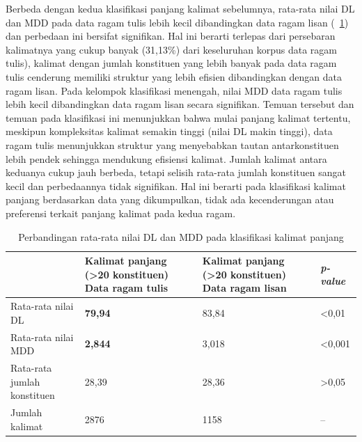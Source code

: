 Berbeda dengan kedua klasifikasi panjang kalimat sebelumnya, rata-rata nilai DL dan MDD pada data ragam tulis lebih kecil dibandingkan data ragam lisan (\tab~\ref{tab:DL_MDD_panjang}) dan perbedaan ini bersifat signifikan. Hal ini berarti terlepas dari persebaran kalimatnya yang cukup banyak (31,13\%) dari keseluruhan korpus data ragam tulis), kalimat dengan jumlah konstituen yang lebih banyak pada data ragam tulis cenderung memiliki struktur yang lebih efisien dibandingkan dengan data ragam lisan. Pada kelompok klasifikasi menengah, nilai MDD data ragam tulis lebih kecil dibandingkan data ragam lisan secara signifikan. Temuan tersebut dan temuan pada klasifikasi ini menunjukkan bahwa mulai panjang kalimat tertentu, meskipun kompleksitas kalimat semakin tinggi (nilai DL makin tinggi), data ragam tulis menunjukkan struktur yang menyebabkan tautan antarkonstituen lebih pendek sehingga mendukung efisiensi kalimat. Jumlah kalimat antara keduanya cukup jauh berbeda, tetapi selisih rata-rata jumlah konstituen sangat kecil dan perbedaannya tidak signifikan. Hal ini berarti pada klasifikasi kalimat panjang berdasarkan data yang dikumpulkan, tidak ada kecenderungan atau preferensi terkait panjang kalimat pada kedua ragam. 

\begin{table}
\begin{center}
\begin{small}
\caption{Perbandingan rata-rata nilai DL dan MDD pada klasifikasi kalimat panjang}  \label{tab:DL_MDD_panjang}
\begin{tabular}{ | p{3.2cm} | p{3.2cm} | p{3.2cm} | p{2cm} |}
    \hline
 & Kalimat panjang \newline (\textgreater20 konstituen) \newline Data ragam tulis & Kalimat panjang \newline (\textgreater20 konstituen) \newline Data ragam lisan & \textit{p-value} \\ \hline
 Rata-rata nilai DL & \textbf{79,94} & 83,84 & \textless 0,01 \\ \hline
 Rata-rata nilai MDD & \textbf{2,844} & 3,018 & \textless 0,001 \\ \hline
 Rata-rata jumlah konstituen & 28,39 & 28,36 & \textgreater 0,05 \\ \hline
 Jumlah kalimat & 2876 & 1158 & -- \\ \hline
   \end{tabular}
   \end{small}
\end{center}
\end{table}

